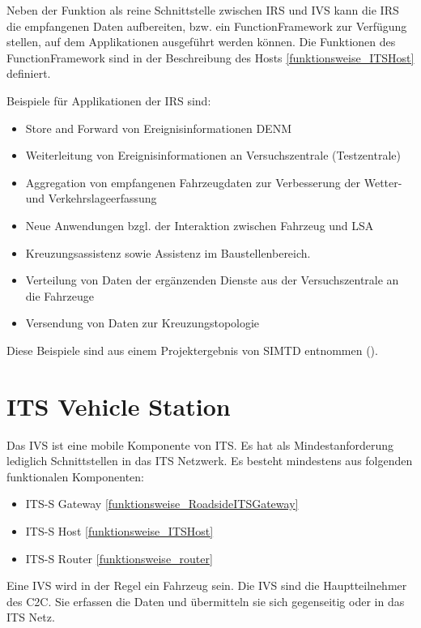 Neben der Funktion als reine Schnittstelle zwischen \ac{IRS} und \ac{IVS} kann die \ac{IRS} die empfangenen Daten aufbereiten, bzw. ein FunctionFramework zur Verfügung stellen, auf dem Applikationen ausgeführt werden können. Die Funktionen des FunctionFramework sind in der Beschreibung des Hosts \ref{funktionsweise_ITSHost} definiert.  

Beispiele für Applikationen der \ac{IRS} sind:
\begin{itemize}
	\item Store and Forward von Ereignisinformationen \ac{DENM}
	\item Weiterleitung von Ereignisinformationen an Versuchszentrale (Testzentrale)
	\item Aggregation von empfangenen Fahrzeugdaten zur Verbesserung der Wetter- und Verkehrslageerfassung
	\item Neue Anwendungen bzgl. der Interaktion zwischen Fahrzeug und LSA
	\item  Kreuzungsassistenz sowie Assistenz im Baustellenbereich.
	\item Verteilung von Daten der ergänzenden Dienste aus der Versuchszentrale an die Fahrzeuge
	\item Versendung von Daten zur Kreuzungstopologie
\end{itemize}

Diese Beispiele sind aus einem Projektergebnis von \ac{SIMTD} entnommen (\cite{simtd-D12.1}). 



\section{ITS Vehicle Station}
Das \ac{IVS} ist eine mobile Komponente von \ac{ITS}. Es hat als Mindestanforderung lediglich Schnittstellen in das \ac{ITS} Netzwerk. Es besteht mindestens aus folgenden funktionalen Komponenten:
\begin{itemize}
	\item  \ac{ITS-S} Gateway \ref{funktionsweise_RoadsideITSGateway}
	\item \ac{ITS-S} Host \ref{funktionsweise_ITSHost}
	\item \ac{ITS-S} Router \ref{funktionsweise_router} 
\end{itemize}

Eine \ac{IVS} wird in der Regel ein Fahrzeug sein. Die \ac{IVS} sind die Hauptteilnehmer des \ac{C2C}. Sie erfassen die Daten und übermitteln sie sich gegenseitig oder in das \ac{ITS} Netz. 